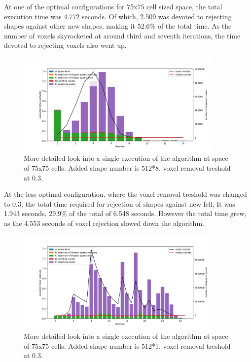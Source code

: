 \documentclass[12pt, oneside]{report}
\begin{document}
At one of the optimal configurations for 75x75 cell sized space, the total execution time was 4.772 seconds. Of which, 2.509 was devoted to rejecting shapes against other new shapes, making it 52.6\% of the total time. As the number of voxels skyrocketed at around third and seventh iterations, the time devoted to rejecting voxels also went up.

\begin{figure}[H]
  \centering
	\label{summary_detail_75_512x8_03}
	\includegraphics[width=0.9\textwidth,keepaspectratio]{Images/SummaryOptimisation/iter_75_512x8_03.pdf}
	\caption{More detailed look into a single execution of the algorithm at space of 75x75 cells. Added shape number is 512*8, voxel removal treshold at 0.3.}
\end{figure}

At the less optimal configuration, where the voxel removal treshold was changed to 0.3, the total time required for rejection of shapes against new fell; It was 1.943 seconds, 29.9\% of the total of 6.548 seconds. However the total time grew, as the 4.553 seconds of voxel rejection slowed down the algorithm.

\begin{figure}[H]
  \centering
	\label{summary_detail_75_512x1_03}
	\includegraphics[width=0.9\textwidth,keepaspectratio]{Images/SummaryOptimisation/iter_75_512x1_03.pdf}
	\caption{More detailed look into a single execution of the algorithm at space of 75x75 cells. Added shape number is 512*1, voxel removal treshold at 0.3.}
\end{figure}
\end{document}
